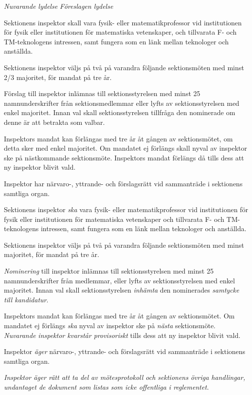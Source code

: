 \documentclass{article}
\newenvironment{lydelse}
    {\begin{paracol}{2}%
        \emph{Nuvarande lydelse}%
        \switchcolumn%
        \emph{Föreslagen lydelse}%
    \end{paracol}%
    \begin{enumerate}[label=\thesubsection.\arabic*]%
    \begin{paracol}{2}%
    }{\end{paracol}\end{enumerate}}
\newcommand{\itemb}{\item[\textbullet]}
\begin{document}
\begin{lydelse}
    \itemb Sektionens inspektor skall vara fysik- eller matematikprofessor vid institutionen för fysik eller institutionen för matematiska vetenskaper, och tillvarata F- och TM-teknologens intressen, samt fungera som en länk mellan teknologer och anställda.
	
	\itemb Sektionens inspektor väljs på två på varandra följande sektionsmöten med minst 2/3 majoritet, för mandat på tre år. 
	
	\itemb Förslag till inspektor inlämnas till sektionsstyrelsen med minst 25 namnunderskrifter från sektionsmedlemmar eller lyfts av sektionsstyrelsen med enkel majoritet. Innan val skall sektionsstyrelsen tillfråga den nominerade om denne är att betrakta som valbar.
	
	\itemb Inspektors mandat kan förlängas med tre år åt gången av sektionsmötet, om detta sker med enkel majoritet. Om mandatet ej förlängs skall nyval av inspektor ske på nästkommande sektionsmöte. Inspektors mandat förlängs då tills dess att ny inspektor blivit vald.

    \itemb Inspektor har närvaro-, yttrande- och förslagsrätt vid sammanträde i sektionens samtliga organ.
    
    \switchcolumn
    \setcounter{enumi}{0}
    
    \item Sektionens inspektor \emph{ska} vara fysik- eller matematikprofessor vid institutionen för fysik eller institutionen för matematiska vetenskaper och tillvarata F- och TM-teknologens intressen, samt fungera som en länk mellan teknologer och anställda.
	
	\item Sektionens inspektor väljs på två på varandra följande sektionsmöten med minst  majoritet, för mandat på tre år. 
	
	\item \emph{Nominering} till inspektor inlämnas till sektionsstyrelsen med minst 25 namnunderskrifter från medlemmar, eller lyfts av sektionsstyrelsen med enkel majoritet. Innan val skall sektionsstyrelsen \emph{inhämta} den nominerades \emph{samtycke till kandidatur}.
	
	\item Inspektors mandat kan förlängas med tre år åt gången av sektionsmötet.
	Om mandatet ej förlängs \emph{ska} nyval av inspektor ske på \emph{nästa} sektionsmöte.
	\emph{Nuvarande inspektor kvarstår provisoriskt} tills dess att ny inspektor blivit vald.

    \item Inspektor \emph{äger} närvaro-, yttrande- och förslagsrätt vid sammanträde i sektionens samtliga organ.
    
    \item \emph{Inspektor äger rätt att ta del av mötesprotokoll och sektionens övriga handlingar, undantaget de dokument som listas som icke offentliga i reglementet.}
\end{lydelse}
\end{document}

